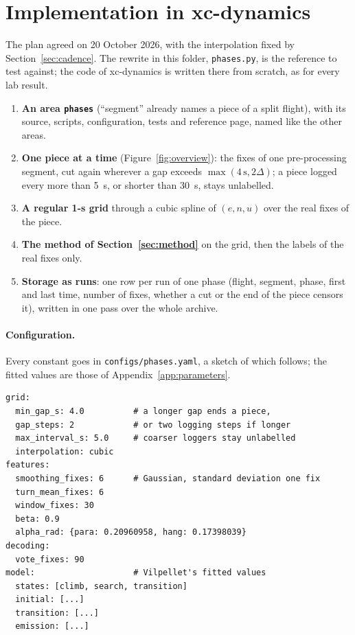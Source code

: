 \section{Implementation in xc-dynamics}\label{sec:implementation}

The plan agreed on 20 October 2026, with the interpolation fixed by Section~\ref{sec:cadence}. The
rewrite in this folder, \texttt{phases.py}, is the reference to test against; the code of
xc-dynamics is written there from scratch, as for every lab result.

\begin{enumerate}
  \item \textbf{An area \texttt{phases}} (``segment'' already names a piece of a split flight),
        with its source, scripts, configuration, tests and reference page, named like the other
        areas.
  \item \textbf{One piece at a time} (Figure~\ref{fig:overview}): the fixes of one
        pre-processing segment, cut again wherever a gap exceeds $\max(4\,\mathrm{s},2\Delta)$;
        a piece logged every more than 5~s, or shorter than 30~s, stays unlabelled.
  \item \textbf{A regular 1-s grid} through a cubic spline of $(e,n,u)$ over the real fixes of the
        piece.
  \item \textbf{The method of Section~\ref{sec:method}} on the grid, then the labels of the real
        fixes only.
  \item \textbf{Storage as runs}: one row per run of one phase (flight, segment, phase, first and
        last time, number of fixes, whether a cut or the end of the piece censors it), written
        in one pass over the whole archive.
\end{enumerate}

\paragraph{Configuration.} Every constant goes in \texttt{configs/phases.yaml}, a sketch of which
follows; the fitted values are those of Appendix~\ref{app:parameters}.
\begin{verbatim}
grid:
  min_gap_s: 4.0          # a longer gap ends a piece,
  gap_steps: 2            # or two logging steps if longer
  max_interval_s: 5.0     # coarser loggers stay unlabelled
  interpolation: cubic
features:
  smoothing_fixes: 6      # Gaussian, standard deviation one fix
  turn_mean_fixes: 6
  window_fixes: 30
  beta: 0.9
  alpha_rad: {para: 0.20960958, hang: 0.17398039}
decoding:
  vote_fixes: 90
model:                    # Vilpellet's fitted values
  states: [climb, search, transition]
  initial: [...]
  transition: [...]
  emission: [...]
\end{verbatim}

